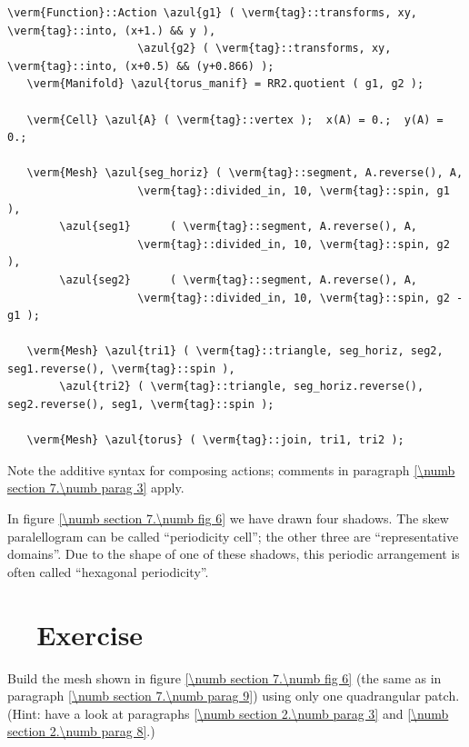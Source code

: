 \begin{Verbatim}[commandchars=\\\{\},formatcom=\small\tt,frame=single,
   label=parag-\ref{\numb section 7.\numb parag 9}.cpp,rulecolor=\color{coment},
   baselinestretch=0.94,framesep=2mm                                            ]
   \verm{Function}::Action \azul{g1} ( \verm{tag}::transforms, xy, \verm{tag}::into, (x+1.) && y ),
                    \azul{g2} ( \verm{tag}::transforms, xy, \verm{tag}::into, (x+0.5) && (y+0.866) );
   \verm{Manifold} \azul{torus_manif} = RR2.quotient ( g1, g2 );

   \verm{Cell} \azul{A} ( \verm{tag}::vertex );  x(A) = 0.;  y(A) = 0.;

   \verm{Mesh} \azul{seg_horiz} ( \verm{tag}::segment, A.reverse(), A,
                    \verm{tag}::divided_in, 10, \verm{tag}::spin, g1 ),
        \azul{seg1}      ( \verm{tag}::segment, A.reverse(), A,
                    \verm{tag}::divided_in, 10, \verm{tag}::spin, g2 ),
        \azul{seg2}      ( \verm{tag}::segment, A.reverse(), A,
                    \verm{tag}::divided_in, 10, \verm{tag}::spin, g2 - g1 );

   \verm{Mesh} \azul{tri1} ( \verm{tag}::triangle, seg_horiz, seg2, seg1.reverse(), \verm{tag}::spin ),
        \azul{tri2} ( \verm{tag}::triangle, seg_horiz.reverse(), seg2.reverse(), seg1, \verm{tag}::spin );
   
   \verm{Mesh} \azul{torus} ( \verm{tag}::join, tri1, tri2 );
\end{Verbatim}

Note the additive syntax for composing actions; comments in paragraph
\ref{\numb section 7.\numb parag 3} apply.

In figure \ref{\numb section 7.\numb fig 6} we have drawn four shadows.
The skew paralellogram can be called ``periodicity cell'';
the other three are ``representative domains''.
Due to the shape of one of these shadows, this periodic arrangement is often called
``hexagonal periodicity''.


\section{~~Exercise}\label{\numb section 7.\numb parag 10}

Build the mesh shown in figure \ref{\numb section 7.\numb fig 6}
(the same as in paragraph \ref{\numb section 7.\numb parag 9}) using only one quadrangular patch.
(Hint: have a look at paragraphs \ref{\numb section 2.\numb parag 3} and
\ref{\numb section 2.\numb parag 8}.)


